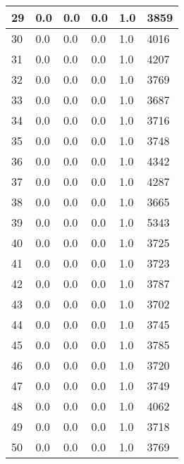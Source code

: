 \begin{longtable}{|l|l|l|l|l|l|}
29 & 0.0 & 0.0 & 0.0 & 1.0 & 3859 \\ \hline 
30 & 0.0 & 0.0 & 0.0 & 1.0 & 4016 \\ \hline 
31 & 0.0 & 0.0 & 0.0 & 1.0 & 4207 \\ \hline 
32 & 0.0 & 0.0 & 0.0 & 1.0 & 3769 \\ \hline 
33 & 0.0 & 0.0 & 0.0 & 1.0 & 3687 \\ \hline 
34 & 0.0 & 0.0 & 0.0 & 1.0 & 3716 \\ \hline 
35 & 0.0 & 0.0 & 0.0 & 1.0 & 3748 \\ \hline 
36 & 0.0 & 0.0 & 0.0 & 1.0 & 4342 \\ \hline 
37 & 0.0 & 0.0 & 0.0 & 1.0 & 4287 \\ \hline 
38 & 0.0 & 0.0 & 0.0 & 1.0 & 3665 \\ \hline 
39 & 0.0 & 0.0 & 0.0 & 1.0 & 5343 \\ \hline 
40 & 0.0 & 0.0 & 0.0 & 1.0 & 3725 \\ \hline 
41 & 0.0 & 0.0 & 0.0 & 1.0 & 3723 \\ \hline 
42 & 0.0 & 0.0 & 0.0 & 1.0 & 3787 \\ \hline 
43 & 0.0 & 0.0 & 0.0 & 1.0 & 3702 \\ \hline 
44 & 0.0 & 0.0 & 0.0 & 1.0 & 3745 \\ \hline 
45 & 0.0 & 0.0 & 0.0 & 1.0 & 3785 \\ \hline 
46 & 0.0 & 0.0 & 0.0 & 1.0 & 3720 \\ \hline 
47 & 0.0 & 0.0 & 0.0 & 1.0 & 3749 \\ \hline 
48 & 0.0 & 0.0 & 0.0 & 1.0 & 4062 \\ \hline 
49 & 0.0 & 0.0 & 0.0 & 1.0 & 3718 \\ \hline 
50 & 0.0 & 0.0 & 0.0 & 1.0 & 3769 \\ \hline 
\end{longtable}